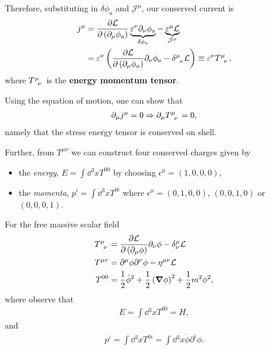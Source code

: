 Therefore, substituting in $\delta \phi_a$ and $\mathcal{J}^{\mu}$, our conserved current is
\begin{align}
    j^{\mu} &= \pdv{\mathcal{L}}{\left( \partial_\mu \phi_a \right) } \underbrace{\epsilon^{\nu} \partial_\nu \phi_a}_{\delta \phi_a} - \underbrace{\epsilon^{\mu} \mathcal{L}}_{\mathcal{J}^{\mu}} \\
    &= \epsilon^{\nu} \left( \pdv{\mathcal{L}}{\left( \partial_\mu \phi_a \right) } \partial_\nu \phi_a - \tensor{\delta}{^{\mu}_\nu} \mathcal{L}\right)  \equiv \epsilon^{\nu} \tensor{T}{^{\mu}_\nu}
,\end{align}
where $\tensor{T}{^{\mu}_{\nu}}$ is the \textbf{energy momentum tensor}.

Using the equation of motion, one can show that
\begin{align}
    \partial_\mu j^{\mu} = 0 \implies \partial_\mu \tensor{T}{^{\mu}_\nu} = 0
,\end{align}
namely that the stress energy tensor is conserved on shell. 

Further, from $T^{\mu \nu}$ we can construct four conserved charges given by
\begin{itemize}
    \item the \textit{energy}, $E = \int \dd{^3x} T^{00}$ by choosing $\epsilon^{\mu} = \left( 1,0,0,0 \right) $,
    \item the \textit{momenta}, $p^{i} = \int \dd{^3x} T^{0i}$ where $\epsilon^{\mu} = \left( 0,1,0,0 \right) $, $\left( 0,0,1,0 \right) $ or $\left( 0,0,0,1 \right) $.
\end{itemize}

\begin{example}
    For the free massive scalar field
    \begin{align}
        \tensor{T}{^{\mu}_{\nu}} &= \pdv{\mathcal{L}}{\left( \partial_\mu \phi \right) } \partial_\nu \phi - \delta^{\mu}_\nu \mathcal{L} \\
        T^{\mu \nu} &= \partial^{\mu} \phi \partial^{\nu} \phi - \eta^{\mu \nu} \mathcal{L} \\
        T^{00} &= \frac{1}{2} \dot{\phi}^2 + \frac{1}{2} \left( \grad \phi \right)^2 + \frac{1}{2} m^2 \phi^2
    ,\end{align}
    where observe that
    \begin{align}
        E = \int \dd{^3x} T^{00} = H
    ,\end{align}
    and
    \begin{align}
        p^{i} = \int \dd{^3x} T^{0i} = \int \dd{^3x} \dot{\phi} \partial^{i} \phi
    .\end{align}
\end{example}

